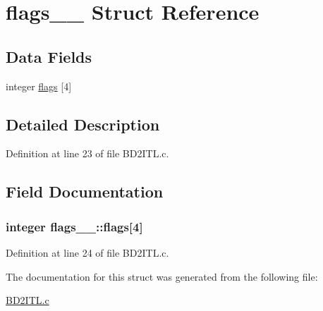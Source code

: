 \hypertarget{structflags__1__}{}\section{flags\+\_\+\_\+ Struct Reference}
\label{structflags__1__}
\subsection*{Data Fields}
\begin{DoxyCompactItemize}
\item 
integer \hyperlink{structflags__1___a7e62fad6f6fb885b2c6d834c6ecc3ac9}{flags} \mbox{[}4\mbox{]}
\end{DoxyCompactItemize}


\subsection{Detailed Description}


Definition at line 23 of file B\+D2\+I\+T\+L.\+c.



\subsection{Field Documentation}
\subsubsection[{\texorpdfstring{flags}{flags}}]{\setlength{\rightskip}{0pt plus 5cm}integer flags\+\_\+\_\+\+::flags\mbox{[}4\mbox{]}}\hypertarget{structflags__1___a7e62fad6f6fb885b2c6d834c6ecc3ac9}{}\label{structflags__1___a7e62fad6f6fb885b2c6d834c6ecc3ac9}


Definition at line 24 of file B\+D2\+I\+T\+L.\+c.



The documentation for this struct was generated from the following file\+:\begin{DoxyCompactItemize}
\item 
\hyperlink{BD2ITL_8c}{B\+D2\+I\+T\+L.\+c}\end{DoxyCompactItemize}
